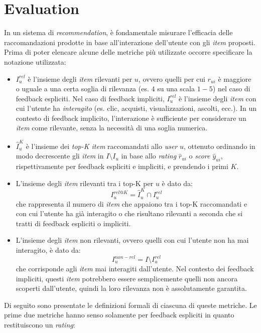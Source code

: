 \section{Evaluation}\label{evaluation}

In un sistema di \textit{recommendation}, è fondamentale misurare l'efficacia delle raccomandazioni prodotte in base all'interazione dell'utente con gli \textit{item} proposti. Prima di poter elencare alcune delle metriche più utilizzate occorre specificare la notazione utilizzata:

\begin{itemize}
    \item $I_u^{rel}$ è l'insieme degli \textit{item} rilevanti per $u$, ovvero quelli per cui $r_{ui}$ è maggiore o uguale a una certa soglia di rilevanza (es. $4$ su una scala $1-5$) nel caso di feedback espliciti. Nel caso di feedback impliciti, $I_u^{rel}$ è l'insieme degli \textit{item} con cui l'utente ha \textit{interagito} (es. clic, acquisti, visualizzazioni, ascolti, ecc.). In un contesto di feedback implicito, l'interazione è sufficiente per considerare un \textit{item} come rilevante, senza la necessità di una soglia numerica.
    \item $\hat{I}_u^K$ è l'insieme dei \textit{top-K item} raccomandati allo \textit{user} $u$, ottenuto ordinando in modo decrescente gli \textit{item} in $I \setminus I_u$ in base allo \textit{rating} $\hat{r}_{ui}$ o \textit{score} $\hat{y}_{ui}$, rispettivamente per feedback espliciti e impliciti, e prendendo i primi $K$.
    \item L'insieme degli \textit{item} rilevanti tra i top-K per $u$ è dato da:
    \[
    I_u^{rel@K} = \hat{I}_u^K \cap I_u^{rel}
    \]
    che rappresenta il numero di \textit{item} che appaiono tra i top-K raccomandati e con cui l'utente ha già interagito o che risultano rilevanti a seconda che si tratti di feedback espliciti o impliciti.
    \item L'insieme degli \textit{item} non rilevanti, ovvero quelli con cui l'utente non ha mai interagito, è dato da:
    \[
    I_u^{non-rel} = I \setminus I_u^{rel}
    \]
    che corrisponde agli \textit{item} mai interagiti dall'utente. Nel contesto dei feedback impliciti, questi \textit{item} potrebbero essere semplicemente quelli non ancora scoperti dall'utente, quindi la loro rilevanza non è assolutamente garantita.
\end{itemize}

Di seguito sono presentate le definizioni formali di ciascuna di queste metriche. Le prime due metriche hanno senso solamente per feedback espliciti in quanto restituiscono un \textit{rating}:


